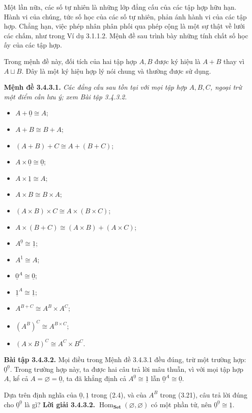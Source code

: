 Một lần nữa, các số tự nhiên là những lớp đẳng cấu của các tập hợp hữu hạn. Hành vi của chúng, tức số học của các số tự nhiên, phản ánh hành vi của các tập hợp. Chẳng hạn, việc phép nhân phân phối qua phép cộng là một sự thật về lưới các chấm, như trong Ví dụ 3.1.1.2. Mệnh đề sau trình bày những tính chất số học ấy của các tập hợp.

Trong mệnh đề này, đối tích của hai tập hợp $A,B$ được ký hiệu là $A+B$ thay vì $A\sqcup B$. Đây là một ký hiệu hợp lý nói chung và thường được sử dụng.

\noindent\textbf{Mệnh đề 3.4.3.1.} \emph{Các đẳng cấu sau tồn tại với mọi tập hợp $A,B,C$, ngoại trừ một điểm cần lưu ý; xem Bài tập 3.4.3.2.}
\begin{itemize}
\item $A+\underline0\cong A$;
\item $A+B\cong B+A$;
\item $(A+B)+C\cong A+(B+C)$;
\item $A\times\underline0\cong\underline0$;
\item $A\times\underline1\cong A$;
\item $A\times B\cong B\times A$;
\item $(A\times B)\times C\cong A\times(B\times C)$;
\item $A\times(B+C)\cong(A\times B)+(A\times C)$;
\item $A^{\underline0}\cong\underline1$;
\item $A^{\underline1}\cong A$;
\item $\underline0^A\cong\underline0$;
\item $\underline1^A\cong\underline1$;
\item $A^{B+C}\cong A^B\times A^C$;
\item $(A^B)^C\cong A^{B\times C}$;
\item $(A\times B)^C\cong A^C\times B^C$.
\end{itemize}

\noindent\textbf{Bài tập 3.4.3.2.} Mọi điều trong Mệnh đề 3.4.3.1 đều đúng, trừ một trường hợp: $\underline0^{\underline0}$. Trong trường hợp này, ta được hai câu trả lời mâu thuẫn, vì với mọi tập hợp $A$, kể cả $A=\varnothing=\underline0$, ta đã khẳng định cả $A^{\underline0}\cong\underline1$ lẫn $\underline0^A\cong\underline0$.

Dựa trên định nghĩa của $\underline0,\underline1$ trong (2.4), và của $A^B$ trong (3.21), câu trả lời đúng cho $\underline0^{\underline0}$ là gì?
\noindent\textbf{Lời giải 3.4.3.2.} $\operatorname{Hom}_{\mathbf{Set}}(\varnothing,\varnothing)$ có một phần tử, nên $\underline0^{\underline0}\cong\underline1$.


